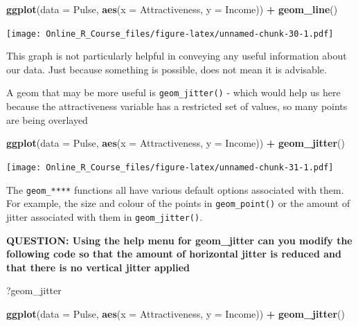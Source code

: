 \documentclass[]{book}
\newenvironment{Shaded}{\begin{snugshade}}{\end{snugshade}}
\newcommand{\DataTypeTok}[1]{\textcolor[rgb]{0.13,0.29,0.53}{#1}}
\newcommand{\KeywordTok}[1]{\textcolor[rgb]{0.13,0.29,0.53}{\textbf{#1}}}
\newcommand{\NormalTok}[1]{#1}
\newcommand{\OperatorTok}[1]{\textcolor[rgb]{0.81,0.36,0.00}{\textbf{#1}}}
\newcommand{\StringTok}[1]{\textcolor[rgb]{0.31,0.60,0.02}{#1}}
\begin{document}
\begin{Shaded}
\begin{Highlighting}[]
\KeywordTok{ggplot}\NormalTok{(}\DataTypeTok{data =}\NormalTok{ Pulse,  }\KeywordTok{aes}\NormalTok{(}\DataTypeTok{x =}\NormalTok{ Attractiveness, }\DataTypeTok{y =}\NormalTok{ Income)) }\OperatorTok{+}\StringTok{ }
\StringTok{  }\KeywordTok{geom_line}\NormalTok{()}
\end{Highlighting}
\end{Shaded}

\texttt{[image: Online\_R\_Course\_files/figure-latex/unnamed-chunk-30-1.pdf]}

This graph is not particularly helpful in conveying any useful information about our data. Just because something is possible, does not mean it is advisable.

A geom that may be more useful is \texttt{geom\_jitter()} - which would help us here because the attractiveness variable has a restricted set of values, so many points are being overlayed

\begin{Shaded}
\begin{Highlighting}[]
\KeywordTok{ggplot}\NormalTok{(}\DataTypeTok{data =}\NormalTok{ Pulse,  }\KeywordTok{aes}\NormalTok{(}\DataTypeTok{x =}\NormalTok{ Attractiveness, }\DataTypeTok{y =}\NormalTok{ Income)) }\OperatorTok{+}\StringTok{ }
\StringTok{  }\KeywordTok{geom_jitter}\NormalTok{()}
\end{Highlighting}
\end{Shaded}

\texttt{[image: Online\_R\_Course\_files/figure-latex/unnamed-chunk-31-1.pdf]}

The \texttt{geom\_****} functions all have various default options associated with them. For example, the size and colour of the points in \texttt{geom\_point()} or the amount of jitter associated with them in \texttt{geom\_jitter()}.

\textbf{QUESTION: Using the help menu for geom\_jitter can you modify the following code so that the amount of horizontal jitter is reduced and that there is no vertical jitter applied}

\begin{Shaded}
\begin{Highlighting}[]
\NormalTok{?geom_jitter}
\end{Highlighting}
\end{Shaded}

\begin{Shaded}
\begin{Highlighting}[]
\KeywordTok{ggplot}\NormalTok{(}\DataTypeTok{data =}\NormalTok{ Pulse,  }\KeywordTok{aes}\NormalTok{(}\DataTypeTok{x =}\NormalTok{ Attractiveness, }\DataTypeTok{y =}\NormalTok{ Income)) }\OperatorTok{+}\StringTok{ }
\StringTok{  }\KeywordTok{geom_jitter}\NormalTok{()}
\end{Highlighting}
\end{Shaded}
\end{document}
